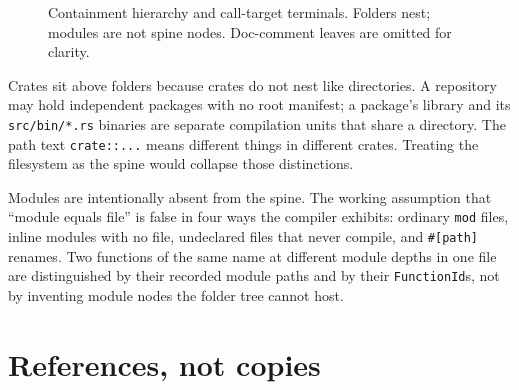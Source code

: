 \documentclass[11pt,a4paper,oneside]{report}
\begin{document}
\begin{figure}[ht]
\centering
{}
\caption{Containment hierarchy and call-target terminals. Folders nest;
  modules are not spine nodes. Doc-comment leaves are omitted for clarity.}
\label{fig:hierarchy}
\end{figure}

Crates sit above folders because crates do not nest like directories. A
repository may hold independent packages with no root manifest; a package's
library and its \texttt{src/bin/*.rs} binaries are separate compilation units
that share a directory. The path text \texttt{crate::...} means different
things in different crates. Treating the filesystem as the spine would
collapse those distinctions.

Modules are intentionally absent from the spine. The working assumption that
``module equals file'' is false in four ways the compiler exhibits: ordinary
\texttt{mod} files, inline modules with no file, undeclared files that never
compile, and \texttt{\#[path]} renames. Two functions of the same name at
different module depths in one file are distinguished by their recorded module
paths and by their \texttt{FunctionId}s, not by inventing module nodes the
folder tree cannot host.

\section{References, not copies}
\end{document}
